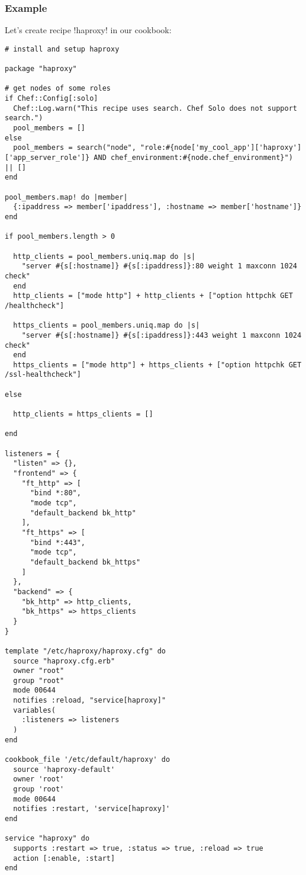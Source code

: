 \subsubsection{Example}

Let's create recipe \inline!haproxy! in our cookbook:

\begin{lstlisting}[label=lst:testing-chef-zero12]
# install and setup haproxy

package "haproxy"

# get nodes of some roles
if Chef::Config[:solo]
  Chef::Log.warn("This recipe uses search. Chef Solo does not support search.")
  pool_members = []
else
  pool_members = search("node", "role:#{node['my_cool_app']['haproxy']['app_server_role']} AND chef_environment:#{node.chef_environment}") || []
end

pool_members.map! do |member|
  {:ipaddress => member['ipaddress'], :hostname => member['hostname']}
end

if pool_members.length > 0

  http_clients = pool_members.uniq.map do |s|
    "server #{s[:hostname]} #{s[:ipaddress]}:80 weight 1 maxconn 1024 check"
  end
  http_clients = ["mode http"] + http_clients + ["option httpchk GET /healthcheck"]

  https_clients = pool_members.uniq.map do |s|
    "server #{s[:hostname]} #{s[:ipaddress]}:443 weight 1 maxconn 1024 check"
  end
  https_clients = ["mode http"] + https_clients + ["option httpchk GET /ssl-healthcheck"]

else

  http_clients = https_clients = []

end

listeners = {
  "listen" => {},
  "frontend" => {
    "ft_http" => [
      "bind *:80",
      "mode tcp",
      "default_backend bk_http"
    ],
    "ft_https" => [
      "bind *:443",
      "mode tcp",
      "default_backend bk_https"
    ]
  },
  "backend" => {
    "bk_http" => http_clients,
    "bk_https" => https_clients
  }
}

template "/etc/haproxy/haproxy.cfg" do
  source "haproxy.cfg.erb"
  owner "root"
  group "root"
  mode 00644
  notifies :reload, "service[haproxy]"
  variables(
    :listeners => listeners
  )
end

cookbook_file '/etc/default/haproxy' do
  source 'haproxy-default'
  owner 'root'
  group 'root'
  mode 00644
  notifies :restart, 'service[haproxy]'
end

service "haproxy" do
  supports :restart => true, :status => true, :reload => true
  action [:enable, :start]
end
\end{lstlisting}

